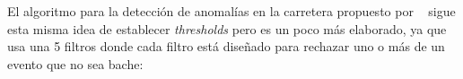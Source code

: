 


		El algoritmo para la detección de anomalías en la carretera propuesto por ~ sigue esta misma idea
		de establecer \emph{thresholds} pero es un poco más elaborado, ya que usa una 5 filtros donde cada filtro está diseñado para rechazar
		uno o más de un evento que no sea bache:\\

